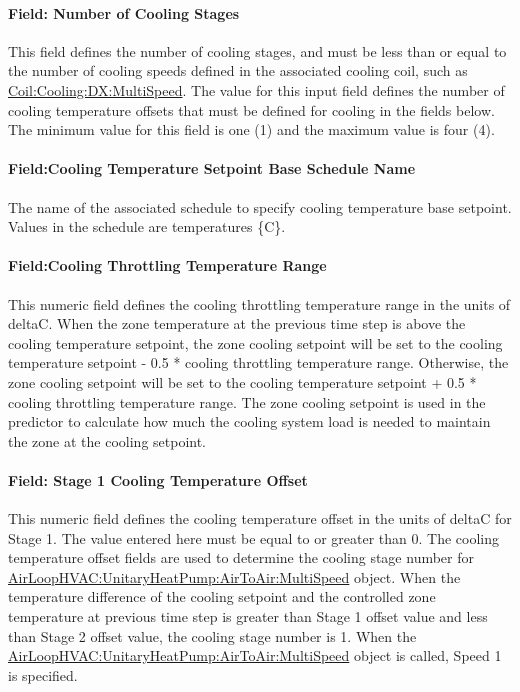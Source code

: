 \paragraph{Field: Number of Cooling Stages}\label{field-number-of-cooling-stages}

This field defines the number of cooling stages, and must be less than or equal to the number of cooling speeds defined in the associated cooling coil, such as \hyperref[coilcoolingdxmultispeed]{Coil:Cooling:DX:MultiSpeed}. The value for this input field defines the number of cooling temperature offsets that must be defined for cooling in the fields below. The minimum value for this field is one (1) and the maximum value is four (4).

\paragraph{Field:Cooling Temperature Setpoint Base Schedule Name}\label{fieldcooling-temperature-setpoint-base-schedule-name}

The name of the associated schedule to specify cooling temperature base setpoint. Values in the schedule are temperatures \{C\}.

\paragraph{Field:Cooling Throttling Temperature Range}\label{fieldcooling-throttling-temperature-range}

This numeric field defines the cooling throttling temperature range in the units of deltaC. When the zone temperature at the previous time step is above the cooling temperature setpoint, the zone cooling setpoint will be set to the cooling temperature setpoint - 0.5 * cooling throttling temperature range. Otherwise, the zone cooling setpoint will be set to the cooling temperature setpoint + 0.5 * cooling throttling temperature range. The zone cooling setpoint is used in the predictor to calculate how much the cooling system load is needed to maintain the zone at the cooling setpoint.

\paragraph{Field: Stage 1 Cooling Temperature Offset}\label{field-stage-1-cooling-temperature-offset}

This numeric field defines the cooling temperature offset in the units of deltaC for Stage 1. The value entered here must be equal to or greater than 0. The cooling temperature offset fields are used to determine the cooling stage number for \hyperref[airloophvacunitaryheatpumpairtoairmultispeed]{AirLoopHVAC:UnitaryHeatPump:AirToAir:MultiSpeed} object. When the temperature difference of the cooling setpoint and the controlled zone temperature at previous time step is greater than Stage 1 offset value and less than Stage 2 offset value, the cooling stage number is 1. When the \hyperref[airloophvacunitaryheatpumpairtoairmultispeed]{AirLoopHVAC:UnitaryHeatPump:AirToAir:MultiSpeed} object is called, Speed 1 is specified.


